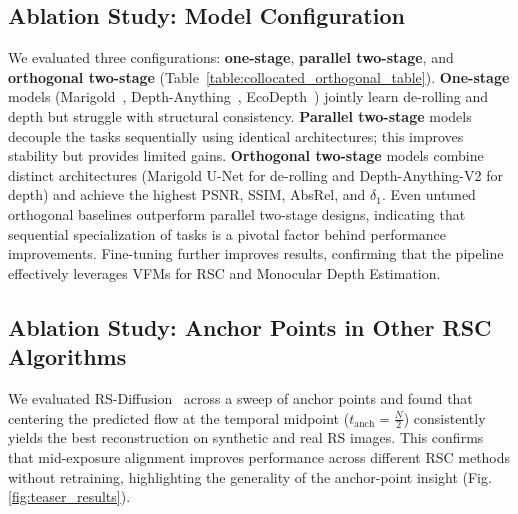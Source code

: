 \subsection{Ablation Study: Model Configuration}
We evaluated three configurations: \textbf{one-stage}, \textbf{parallel two-stage}, and \textbf{orthogonal two-stage} (Table~\ref{table:collocated_orthogonal_table}). 
\textbf{One-stage} models (Marigold~\cite{StableDiffusion}, Depth-Anything~\cite{DepthAnything}, EcoDepth~\cite{ecodepth}) jointly learn de-rolling and depth but struggle with structural consistency. \textbf{Parallel two-stage} models decouple the tasks sequentially using identical architectures; this improves stability but provides limited gains. 
\textbf{Orthogonal two-stage} models combine distinct architectures (Marigold U-Net for de-rolling and Depth-Anything-V2 for depth) and achieve the highest PSNR, SSIM, AbsRel, and $\delta_1$. Even untuned orthogonal baselines outperform parallel two-stage designs, indicating that sequential specialization of tasks is a pivotal factor behind performance improvements. Fine-tuning further improves results, confirming that the pipeline effectively leverages VFMs for RSC and Monocular Depth Estimation.




\subsection{Ablation Study: Anchor Points in Other RSC Algorithms}
We evaluated RS-Diffusion~\cite{RS-Diffusion} across a sweep of anchor points and found that centering the predicted flow at the temporal midpoint ($t_{\text{anch}} = \frac{N}{2}$) consistently yields the best reconstruction on synthetic and real RS images.  This confirms that mid-exposure alignment improves performance across different RSC methods without retraining, highlighting the generality of the anchor-point insight (Fig. \ref{fig:teaser_results}).



